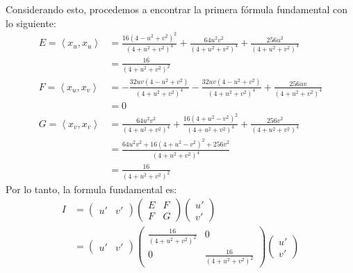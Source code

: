 \begin{problema}
\begin{dem}
Considerando esto, procedemos a encontrar la primera fórmula fundamental con lo siguiente: 
\begin{align*}
    E = \left\langle x_u,x_u\right\rangle &= \frac{16(4-u^2+v^2)^2}{(4+u^2+v^2)^4}+\frac{64u^2v^2}{(4+u^2+v^2)^4}+\frac{256u^2}{(4+u^2+v^2)^4}\\
    &= \frac{16}{(4+u^2+v^2)^2}\\
     F = \left\langle x_u,x_v\right\rangle &= -\frac{32uv(4-u^2+v^2)}{(4+u^2+v^2)^4}-\frac{32uv(4-u^2+v^2)}{(4+u^2+v^2)^4}+\frac{256uv}{(4+u^2+v^2)^4}\\
     &= 0\\
     G = \left\langle x_v,x_v\right\rangle &= \frac{64u^2v^2}{(4+u^2+v^2)^4}+\frac{16(4+u^2-v^2)^2}{(4+u^2+v^2)^4}+\frac{256v^2}{(4+u^2+v^2)^4}\\
     &= \frac{64u^2v^2+16(4+u^2-v^2)^2+256v^2}{(4+u^2+v^2)^4}\\
     &= \frac{16}{(4+u^2+v^2)^2}
\end{align*}
Por lo tanto, la formula fundamental es: 
\begin{align*}
    I&= \begin{pmatrix}
        u' & v'
    \end{pmatrix}\begin{pmatrix}
        E & F\\
        F & G
    \end{pmatrix} \begin{pmatrix}
        u'\\
        v'
    \end{pmatrix}\\
    &= \begin{pmatrix}
        u' & v'
    \end{pmatrix}\begin{pmatrix}
        \frac{16}{(4+u^2+v^2)^2} & 0\\
        0 &  \frac{16}{(4+u^2+v^2)^2}
    \end{pmatrix} \begin{pmatrix}
        u'\\
        v'
    \end{pmatrix}\\
\end{align*}

    \end{dem}
    
\end{problema}

